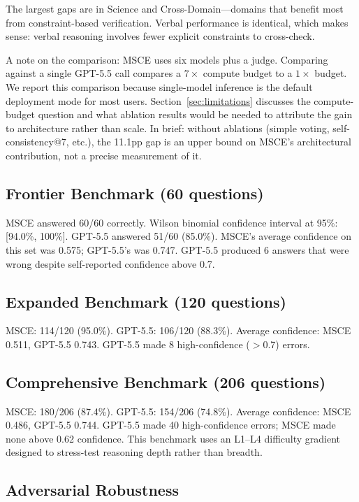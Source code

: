 \documentclass[11pt,a4paper]{article}
\begin{document}
The largest gaps are in Science and Cross-Domain---domains that benefit most from constraint-based verification. Verbal performance is identical, which makes sense: verbal reasoning involves fewer explicit constraints to cross-check.

A note on the comparison: MSCE uses six models plus a judge. Comparing against a single GPT-5.5 call compares a $7\times$ compute budget to a $1\times$ budget. We report this comparison because single-model inference is the default deployment mode for most users. Section~\ref{sec:limitations} discusses the compute-budget question and what ablation results would be needed to attribute the gain to architecture rather than scale. In brief: without ablations (simple voting, self-consistency@7, etc.), the 11.1pp gap is an upper bound on MSCE's architectural contribution, not a precise measurement of it.

\subsection{Frontier Benchmark (60 questions)}

MSCE answered 60/60 correctly. Wilson binomial confidence interval at 95\%: [94.0\%, 100\%]. GPT-5.5 answered 51/60 (85.0\%). MSCE's average confidence on this set was 0.575; GPT-5.5's was 0.747. GPT-5.5 produced 6 answers that were wrong despite self-reported confidence above 0.7.

\subsection{Expanded Benchmark (120 questions)}

MSCE: 114/120 (95.0\%). GPT-5.5: 106/120 (88.3\%). Average confidence: MSCE 0.511, GPT-5.5 0.743. GPT-5.5 made 8 high-confidence ($>$0.7) errors.

\subsection{Comprehensive Benchmark (206 questions)}

MSCE: 180/206 (87.4\%). GPT-5.5: 154/206 (74.8\%). Average confidence: MSCE 0.486, GPT-5.5 0.744. GPT-5.5 made 40 high-confidence errors; MSCE made none above 0.62 confidence. This benchmark uses an L1--L4 difficulty gradient designed to stress-test reasoning depth rather than breadth.

\subsection{Adversarial Robustness}
\end{document}
